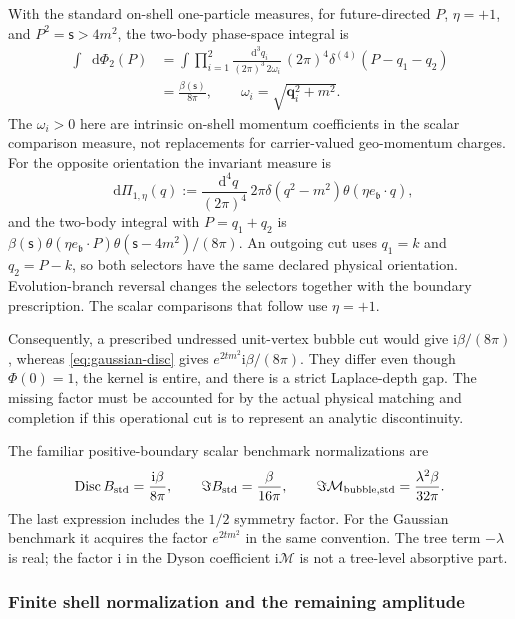 \documentclass[final,5p,times,twocolumn,numbers,nopreprintline]{elsarticle}
\numberwithin{equation}{section}
\theoremstyle{definition}
\theoremstyle{remark}
\newcommand{\dd}{\mathop{}\!\mathrm d}
\newcommand{\ii}{\mathrm i}
\newcommand{\bb}{\mathfrak b}
\newcommand{\Ph}{\Phi}
\newcommand{\Disc}{\operatorname{Disc}}
\newcommand{\ee}{e_{\bb}}
\newcommand{\sMand}{\mathsf{s}}
\begin{document}
With the standard on-shell one-particle measures, for
future-directed \(P\), \(\eta=+1\), and
\(P^2=\sMand>4m^2\), the two-body
phase-space integral is
\begin{equation}
\begin{aligned}
 \int\dd\Phi_2(P)
 &=\int\prod_{i=1}^2\frac{\dd^3q_i}{(2\pi)^3\,2\omega_i}\,
        (2\pi)^4\delta^{(4)}(P-q_1-q_2)\\
 &=\frac{\beta(\sMand)}{8\pi},\qquad
 \omega_i=\sqrt{\mathbf q_i^2+m^2}.
\end{aligned}
 \label{eq:two-body-phase-space}
\end{equation}
The \(\omega_i>0\) here are intrinsic on-shell momentum
coefficients in the scalar comparison measure, not replacements
for carrier-valued geo-momentum charges.
For the opposite orientation the invariant measure is
\begin{equation}
 \dd\Pi_{1,\eta}(q)
  :=\frac{\dd^4q}{(2\pi)^4}\,2\pi\delta(q^2-m^2)
       \theta(\eta\ee\!\cdot q),
 \label{eq:oriented-one-particle-measure}
\end{equation}
and the two-body integral with \(P=q_1+q_2\) is
\(\beta(\sMand)\theta(\eta\ee\!\cdot P)
\theta(\sMand-4m^2)/(8\pi)\).
An outgoing cut uses \(q_1=k\) and \(q_2=P-k\), so both
selectors have the same declared physical orientation. Evolution-branch
reversal changes the selectors together with the boundary prescription.
The scalar comparisons that follow use \(\eta=+1\).

Consequently, a prescribed undressed unit-vertex bubble cut would
give \(\ii\beta/(8\pi)\), whereas
\eqref{eq:gaussian-disc} gives
\(e^{2tm^2}\ii\beta/(8\pi)\).
They differ even though \(\Ph(0)=1\), the kernel is entire, and
there is a strict Laplace-depth gap. The missing factor must be
accounted for by the actual physical matching and completion if
this operational cut is to represent an analytic discontinuity.

The familiar positive-boundary scalar benchmark normalizations are
\[
 \Disc B_{\rm std}=\frac{\ii\beta}{8\pi},\qquad
 \Im B_{\rm std}=\frac{\beta}{16\pi},\qquad
 \Im\mathcal M_{\rm bubble,std}
      =\frac{\lambda^2\beta}{32\pi}.
\]
The last expression includes the \(1/2\) symmetry factor.
For the Gaussian benchmark it acquires the factor \(e^{2tm^2}\)
in the same convention. The tree term \(-\lambda\) is real;
the factor \(\ii\) in the Dyson coefficient \(\ii\mathcal M\)
is not a tree-level absorptive part.

\subsubsection*{Finite shell normalization and the remaining amplitude}
\end{document}
